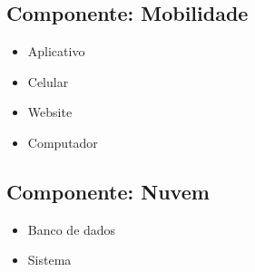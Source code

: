 \subsection{Componente: Mobilidade}
\begin{itemize}
       \item Aplicativo
       \item Celular
       \item Website
       \item Computador
\end{itemize}

\subsection{Componente: Nuvem}
\begin{itemize}
       \item Banco de dados
       \item Sistema
\end{itemize}



